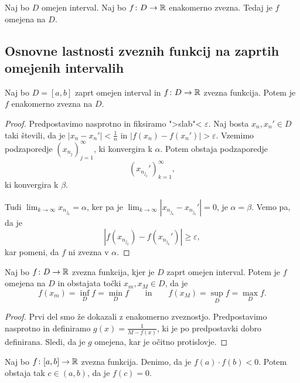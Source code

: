 \documentclass[12pt, a4paper]{article}
\begin{document}
\begin{trditev}
Naj bo $D$ omejen interval. Naj bo $f\colon D\to\mathbb{R}$ enakomerno zvezna. Tedaj je $f$ omejena na $D$.
\end{trditev}

\obvs

\newpage

\subsection{Osnovne lastnosti zveznih funkcij na zaprtih omejenih intervalih}

\begin{izrek}
Naj bo $D=[a,b]$ zaprt omejen interval in $f\colon D\to\mathbb{R}$ zvezna funkcija. Potem je $f$ enakomerno zvezna na $D$.
\end{izrek}

\begin{proof}
Predpostavimo nasprotno in fiksiramo ">slab"< $\varepsilon$. Naj bosta $x_n,x_n'\in D$ taki števili, da je $|x_n-x_n'|<\frac{1}{n}$ in $|f(x_n)-f(x_n')|>\varepsilon$. Vzemimo podzaporedje $\left(x_{n_j}\right)_{j=1}^\infty$, ki konvergira k $\alpha$. Potem obstaja podzaporedje
\[
\left(x_{n_{j_k}}'\right)_{k=1}^\infty,
\]
ki konvergira k $\beta$.

Tudi $\displaystyle\lim_{k\to\infty}x_{n_{j_k}}=\alpha$, ker pa je $\displaystyle\lim_{k\to\infty}\left|x_{n_{j_k}}-x_{n_{j_k}}'\right|=0$, je $\alpha=\beta.$ Vemo pa, da je
\[
\left|f\left(x_{n_{j_k}}\right)-f\left(x_{n_{j_k}}'\right)\right|\geq\varepsilon,
\]
kar pomeni, da $f$ ni zvezna v $\alpha$.
\end{proof}

\begin{izrek}
Naj bo $f\colon D\to\mathbb{R}$ zvezna funkcija, kjer je $D$ zaprt omejen interval. Potem je $f$ omejena na $D$ in obstajata točki $x_m,x_M\in D$, da je
\[
f(x_m)=\inf_D f=\min_D f\qquad\text{in}\qquad f(x_M)=\sup_D f=\max_D f.
\]
\end{izrek}

\begin{proof}
Prvi del smo že dokazali z enakomerno zveznostjo. Predpostavimo nasprotno in definiramo $g(x)=\frac{1}{M-f(x)}$, ki je po predpostavki dobro definirana. Sledi, da je $g$ omejena, kar je očitno protislovje.
\end{proof}

\begin{izrek}
Naj bo $f\colon [a,b]\to\mathbb{R}$ zvezna funkcija. Denimo, da je $f(a)\cdot f(b)<0$. Potem obstaja tak $c\in(a,b)$, da je $f(c)=0$.
\end{izrek}
\end{document}
